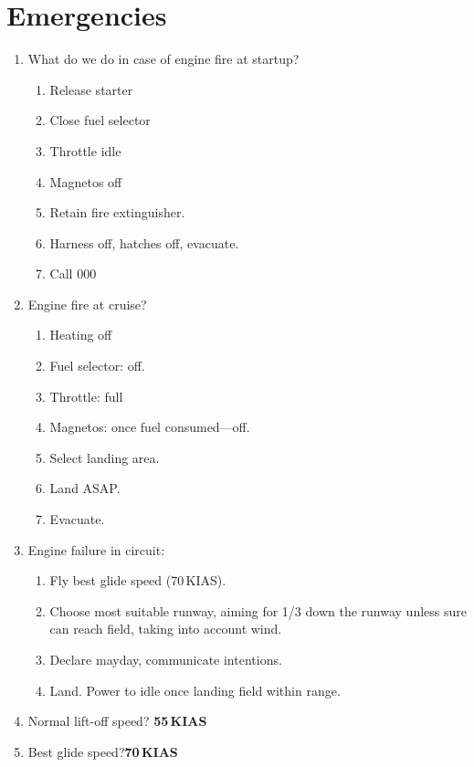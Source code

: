 \documentclass[11pt]{article}
\begin{document}
\section{Emergencies}
\begin{enumerate}
	\item What do we do in case of engine fire at startup?
	\begin{enumerate}
		\item Release starter
		\item Close fuel selector
		\item Throttle idle
		\item Magnetos off
		\item Retain fire extinguisher.
		\item Harness off, hatches off, evacuate.
		\item Call 000
	\end{enumerate}
	\item Engine fire at cruise?
	\begin{enumerate}
		\item Heating off
		\item Fuel selector: off.
		\item Throttle: full
		\item Magnetos: once fuel consumed---off.
		\item Select landing area.
		\item Land ASAP.
		\item Evacuate.
	\end{enumerate}
	\item Engine failure in circuit:
	\begin{enumerate}
		\item Fly best glide speed (70\,KIAS). 
		\item Choose most suitable runway, aiming for 1/3 down the runway unless sure can reach field, taking into account wind.
		\item Declare mayday, communicate intentions.
		\item Land. Power to idle once landing field within range.
	\end{enumerate}
	\item Normal lift-off speed? \hfill\textbf{55\,KIAS}
	\item Best glide speed?\hfill\textbf{70\,KIAS}
\end{enumerate}
\end{document}

